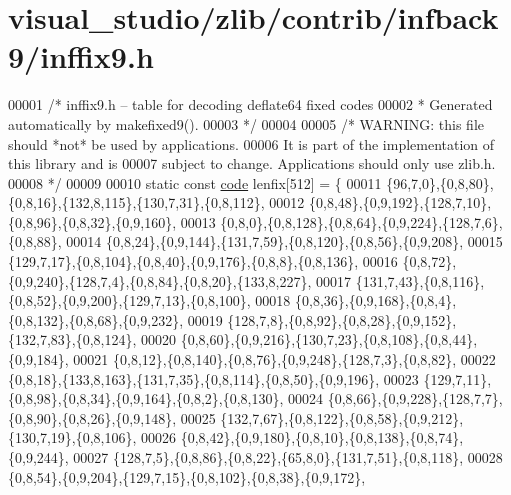 \hypertarget{visual__studio_2zlib_2contrib_2infback9_2inffix9_8h_source}{}\section{visual\+\_\+studio/zlib/contrib/infback9/inffix9.h}
\label{visual__studio_2zlib_2contrib_2infback9_2inffix9_8h_source}

\begin{DoxyCode}
00001     \textcolor{comment}{/* inffix9.h -- table for decoding deflate64 fixed codes}
00002 \textcolor{comment}{     * Generated automatically by makefixed9().}
00003 \textcolor{comment}{     */}
00004 
00005     \textcolor{comment}{/* WARNING: this file should *not* be used by applications.}
00006 \textcolor{comment}{       It is part of the implementation of this library and is}
00007 \textcolor{comment}{       subject to change. Applications should only use zlib.h.}
00008 \textcolor{comment}{     */}
00009 
00010     \textcolor{keyword}{static} \textcolor{keyword}{const} \hyperlink{structcode}{code} lenfix[512] = \{
00011         \{96,7,0\},\{0,8,80\},\{0,8,16\},\{132,8,115\},\{130,7,31\},\{0,8,112\},
00012         \{0,8,48\},\{0,9,192\},\{128,7,10\},\{0,8,96\},\{0,8,32\},\{0,9,160\},
00013         \{0,8,0\},\{0,8,128\},\{0,8,64\},\{0,9,224\},\{128,7,6\},\{0,8,88\},
00014         \{0,8,24\},\{0,9,144\},\{131,7,59\},\{0,8,120\},\{0,8,56\},\{0,9,208\},
00015         \{129,7,17\},\{0,8,104\},\{0,8,40\},\{0,9,176\},\{0,8,8\},\{0,8,136\},
00016         \{0,8,72\},\{0,9,240\},\{128,7,4\},\{0,8,84\},\{0,8,20\},\{133,8,227\},
00017         \{131,7,43\},\{0,8,116\},\{0,8,52\},\{0,9,200\},\{129,7,13\},\{0,8,100\},
00018         \{0,8,36\},\{0,9,168\},\{0,8,4\},\{0,8,132\},\{0,8,68\},\{0,9,232\},
00019         \{128,7,8\},\{0,8,92\},\{0,8,28\},\{0,9,152\},\{132,7,83\},\{0,8,124\},
00020         \{0,8,60\},\{0,9,216\},\{130,7,23\},\{0,8,108\},\{0,8,44\},\{0,9,184\},
00021         \{0,8,12\},\{0,8,140\},\{0,8,76\},\{0,9,248\},\{128,7,3\},\{0,8,82\},
00022         \{0,8,18\},\{133,8,163\},\{131,7,35\},\{0,8,114\},\{0,8,50\},\{0,9,196\},
00023         \{129,7,11\},\{0,8,98\},\{0,8,34\},\{0,9,164\},\{0,8,2\},\{0,8,130\},
00024         \{0,8,66\},\{0,9,228\},\{128,7,7\},\{0,8,90\},\{0,8,26\},\{0,9,148\},
00025         \{132,7,67\},\{0,8,122\},\{0,8,58\},\{0,9,212\},\{130,7,19\},\{0,8,106\},
00026         \{0,8,42\},\{0,9,180\},\{0,8,10\},\{0,8,138\},\{0,8,74\},\{0,9,244\},
00027         \{128,7,5\},\{0,8,86\},\{0,8,22\},\{65,8,0\},\{131,7,51\},\{0,8,118\},
00028         \{0,8,54\},\{0,9,204\},\{129,7,15\},\{0,8,102\},\{0,8,38\},\{0,9,172\},

\end{DoxyCode}
